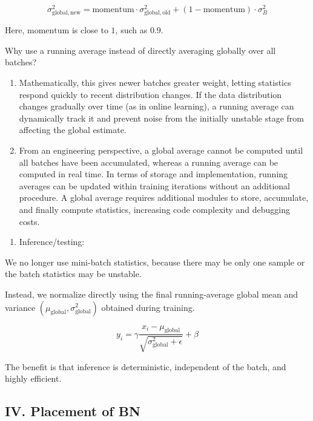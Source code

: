 \[
\sigma_{\mathrm{global,new}}^2
= \mathrm{momentum}\cdot\sigma_{\mathrm{global,old}}^2
+ (1-\mathrm{momentum})\cdot\sigma_B^2
\]

Here, \(\mathrm{momentum}\) is close to \(1\), such as \(0.9\).

Why use a running average instead of directly averaging globally over all batches?

\begin{enumerate}
\def\labelenumi{(\arabic{enumi})}
\item
  Mathematically, this gives newer batches greater weight, letting statistics respond quickly to recent distribution changes. If the data distribution changes gradually over time (as in online learning), a running average can dynamically track it and prevent noise from the initially unstable stage from affecting the global estimate.
\item
  From an engineering perspective, a global average cannot be computed until all batches have been accumulated, whereas a running average can be computed in real time. In terms of storage and implementation, running averages can be updated within training iterations without an additional procedure. A global average requires additional modules to store, accumulate, and finally compute statistics, increasing code complexity and debugging costs.
\end{enumerate}

\begin{enumerate}
\def\labelenumi{\arabic{enumi}.}
\setcounter{enumi}{1}
\tightlist
\item
{}
  Inference/testing:
\end{enumerate}

We no longer use mini-batch statistics, because there may be only one sample or the batch statistics may be unstable.

Instead, we normalize directly using the final running-average global mean and variance \((\mu_{\text{global}},\sigma_{\text{global}}^2)\) obtained during training.

\[
y_i=\gamma\frac{x_i-\mu_{\text{global}}}{\sqrt{\sigma_{\text{global}}^2+\epsilon}}+\beta
\]

The benefit is that inference is deterministic, independent of the batch, and highly efficient.

\hypertarget{iv.-placement-of-bn}{%
\subsection{IV. Placement of BN}\label{iv.-placement-of-bn}}

